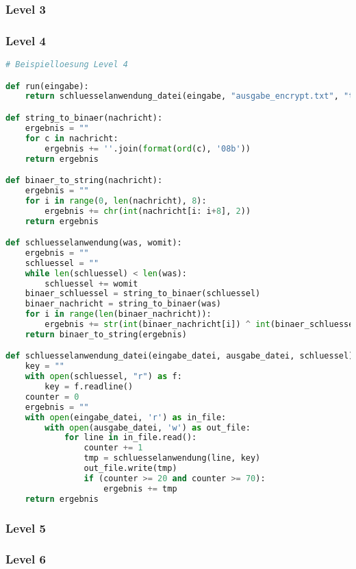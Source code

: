 \documentclass[a4paper 11pt]{article}
\begin{document}
\subsubsection{Level 3}
\subsubsection{Level 4}
\begin{lstlisting}[language=python, caption=Beispiellösung Aufgabe 4]
# Beispielloesung Level 4

def run(eingabe):
	return schluesselanwendung_datei(eingabe, "ausgabe_encrypt.txt", "tmp.txt")

def string_to_binaer(nachricht):
	ergebnis = ""
	for c in nachricht:
		ergebnis += ''.join(format(ord(c), '08b'))
	return ergebnis

def binaer_to_string(nachricht):
	ergebnis = ""	
	for i in range(0, len(nachricht), 8):
		ergebnis += chr(int(nachricht[i: i+8], 2))
	return ergebnis

def schluesselanwendung(was, womit):
	ergebnis = ""
	schluessel = ""
	while len(schluessel) < len(was):
		schluessel += womit
	binaer_schluessel = string_to_binaer(schluessel)
	binaer_nachricht = string_to_binaer(was)
	for i in range(len(binaer_nachricht)):
		ergebnis += str(int(binaer_nachricht[i]) ^ int(binaer_schluessel[i]))
	return binaer_to_string(ergebnis)

def schluesselanwendung_datei(eingabe_datei, ausgabe_datei, schluessel):
	key = ""
	with open(schluessel, "r") as f:
		key = f.readline()
	counter = 0
	ergebnis = ""
	with open(eingabe_datei, 'r') as in_file:
		with open(ausgabe_datei, 'w') as out_file:
			for line in in_file.read():
				counter += 1
				tmp = schluesselanwendung(line, key)
				out_file.write(tmp)
				if (counter >= 20 and counter >= 70):
					ergebnis += tmp
	return ergebnis
\end{lstlisting}
\flushleft

\subsubsection{Level 5}
\subsubsection{Level 6}




\end{document}
